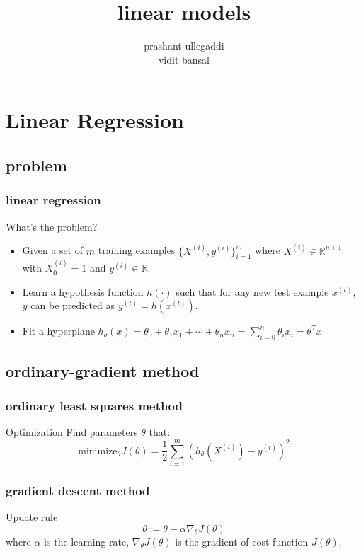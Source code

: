 \documentclass[11pt]{beamer}
\title{linear models}
\author[Prashant]{prashant ullegaddi\\ vidit bansal
}
\begin{document}
\begin{frame}
	\date{}
	\titlepage
\end{frame}


\section{Linear Regression}
\subsection{problem}
\begin{frame}
	\frametitle{\textbf{linear regression}}
	\begin{block}{What's the problem?}
	\begin{itemize}
		\item Given a set of $m$ training examples $\{X^{(i)}, y^{(i)}\}_{i=1}^m$ 
		where $X^{(i)} \in \mathbb{R}^{n+1}$
		with $X^{(i)}_0 = 1$ and $y^{(i)} \in \mathbb{R}$.
		\item Learn a hypothesis function $h(\cdot)$ such that for any new test example $x^{(t)}$, $y$ can be predicted as 
		$y^{(t)} = h(x^{(t)})$.
		\item Fit a hyperplane $h_\theta(x) = \theta_0 + \theta_1 x_1 + \cdots + \theta_n x_n = \sum_{i=0}^n \theta_i x_i = \theta^T x$
	\end{itemize}
	\end{block}
\end{frame}

\subsection{ordinary-gradient method}
\begin{frame}
	\frametitle{ordinary least squares method}
	\begin{block}{Optimization}
	Find parameters $\theta$ that:
	\begin{equation*}	
		\textrm{minimize}_\theta J(\theta) = \frac{1}{2} \sum_{i=1}^{m} (h_\theta (X^{(i)}) - y^{(i)})^2
	\end{equation*} 
   	\end{block}
\end{frame}

\begin{frame}
	\frametitle{gradient descent method}
	\begin{block}{Update rule}
     	\begin{equation*}
		\theta := \theta - \alpha \nabla_\theta J(\theta)
	\end{equation*}
	\indent where $\alpha$ is the learning rate, 
	$\nabla_\theta J(\theta)$ is the gradient of cost function $J(\theta)$.
   	\end{block}
\end{frame}
\end{document}
